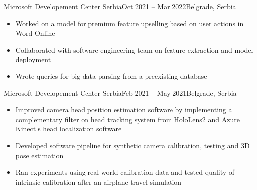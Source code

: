 \documentclass[10pt,a4paper]{source/altacv}
\begin{document}
\tagline{}

%

\begin{fullwidth}
\makecvheader 
\end{fullwidth}

%



 {Microsoft Developement Center Serbia}{Oct 2021 -- Mar 2022}{Belgrade, Serbia}

\begin{itemize}
    \item   \small{Worked on a model for premium feature upselling based on user actions in Word Online}
    \item   \small{Collaborated with software engineering team on feature extraction and model deployment}
    \item \small{Wrote queries for big data parsing from a preexisting database}
    \\
    \smallskip
       

\end{itemize}

\divider

 {Microsoft Developement Center Serbia}{Feb 2021 -- May 2021}{Belgrade, Serbia}

\begin{itemize}
    \item   \small{Improved camera head position estimation software by implementing a complementary filter on head tracking system from HoloLens2 and Azure Kinect's head localization software}
    \item   \small{Developed software pipeline for synthetic camera calibration, testing and 3D pose estimation}
    \item \small{Ran experiments using real-world calibration data and tested quality of intrinsic calibration after an airplane travel simulation}
    \\
    \smallskip
      

\end{itemize}
\end{document}
